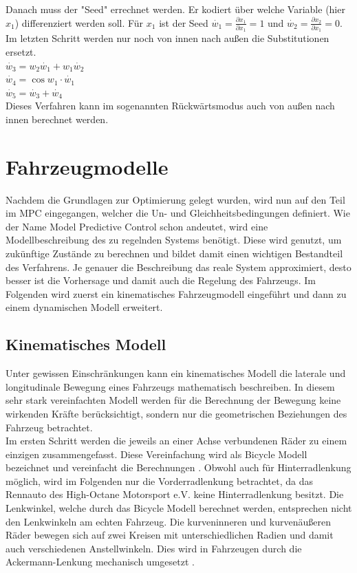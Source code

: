 \documentclass{like}
\begin{document}
Danach muss der "Seed" errechnet werden. Er kodiert über welche Variable (hier $x_1$) differenziert werden soll. Für $x_1$ ist der Seed $\dot{w_1} = \frac{\partial x_1}{\partial x_1} = 1$ und   $\dot{w_2} = \frac{\partial x_2}{\partial x_1} = 0$.
Im letzten Schritt werden nur noch von innen nach außen die Substitutionen ersetzt. \\
$\dot{w_3} = w_2\dot{w_1} + w_1 \dot{w_2}$ \\
$\dot{w_4} = \cos{w_1} \cdot \dot{w_1}$ \\
$\dot{w_5} = \dot{w_3} + \dot{w_4}$ \\
Dieses Verfahren kann im sogenannten Rückwärtsmodus auch von außen nach innen berechnet werden.  

\newpage
\section{Fahrzeugmodelle}
Nachdem die Grundlagen zur Optimierung gelegt wurden, wird nun auf den Teil im \ac{MPC} eingegangen, welcher die Un- und Gleichheitsbedingungen definiert.
Wie der Name Model Predictive Control schon andeutet, wird eine Modellbeschreibung des zu regelnden Systems benötigt. Diese wird genutzt, um zukünftige Zustände zu berechnen und bildet damit einen wichtigen Bestandteil des Verfahrens. Je genauer die Beschreibung das reale System approximiert, desto besser ist die Vorhersage und damit auch die Regelung des Fahrzeugs.
Im Folgenden wird zuerst ein kinematisches Fahrzeugmodell eingeführt und dann zu einem dynamischen Modell erweitert.   

\subsection{Kinematisches Modell}
\label{kinematicModel}
Unter gewissen Einschränkungen kann ein kinematisches Modell die laterale und longitudinale Bewegung eines Fahrzeugs mathematisch beschreiben. In diesem sehr stark vereinfachten Modell werden für die Berechnung der Bewegung keine wirkenden Kräfte berücksichtigt, sondern nur die geometrischen Beziehungen des Fahrzeug betrachtet. \\
Im ersten Schritt werden die jeweils an einer Achse verbundenen Räder zu einem einzigen zusammengefasst. Diese Vereinfachung wird als Bicycle Modell bezeichnet und vereinfacht die Berechnungen \cite{BicycleModel}. Obwohl auch für Hinterradlenkung möglich, wird im Folgenden nur die Vorderradlenkung betrachtet, da das Rennauto des High-Octane Motorsport e.V. keine Hinterradlenkung besitzt. Die Lenkwinkel, welche durch das Bicycle Modell berechnet werden, entsprechen nicht den Lenkwinkeln am echten Fahrzeug. Die kurveninneren und kurvenäußeren Räder bewegen sich auf zwei Kreisen mit unterschiedlichen Radien und damit auch verschiedenen Anstellwinkeln. Dies wird in Fahrzeugen durch die Ackermann-Lenkung mechanisch umgesetzt \cite{rajamani2011vehicle}.
\end{document}
